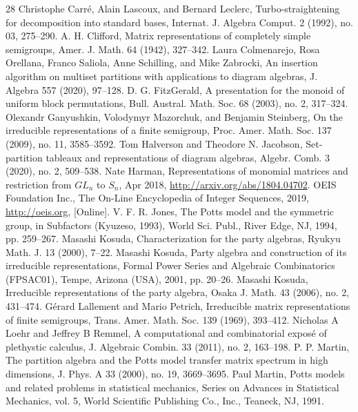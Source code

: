 \begin{thebibliography}{28}
 Christophe Carr\'e, Alain Lascoux, and Bernard Leclerc, Turbo-straightening for decomposition into standard bases, Internat. J. Algebra Comput. 2 (1992), no. 03, 275--290.
 A. H. Clifford, Matrix representations of completely simple semigroups, Amer. J. Math. 64 (1942), 327--342.
 Laura Colmenarejo, Rosa Orellana, Franco Saliola, Anne Schilling, and Mike Zabrocki, An insertion algorithm on multiset partitions with applications to diagram algebras, J. Algebra 557 (2020), 97--128.
 D. G. FitzGerald, A presentation for the monoid of uniform block permutations, Bull. Austral. Math. Soc. 68 (2003), no. 2, 317--324.
 Olexandr Ganyushkin, Volodymyr Mazorchuk, and Benjamin Steinberg, On the irreducible representations of a finite semigroup, Proc. Amer. Math. Soc. 137 (2009), no. 11, 3585--3592.
 Tom Halverson and Theodore N. Jacobson, Set-partition tableaux and representations of diagram algebras, Algebr. Comb. 3 (2020), no. 2, 509--538.
 Nate Harman, Representations of monomial matrices and restriction from $GL_n$ to $S_n$, Apr 2018, \url{http://arxiv.org/abs/1804.04702}.
 OEIS Foundation Inc., The On-Line Encyclopedia of Integer Sequences, 2019, \url{http://oeis.org}, [Online].
 V. F. R. Jones, The Potts model and the symmetric group, in Subfactors (Kyuzeso, 1993), World Sci. Publ., River Edge, NJ, 1994, pp. 259--267.
 Masashi Kosuda, Characterization for the party algebras, Ryukyu Math. J. 13 (2000), 7--22.
 Masashi Kosuda, Party algebra and construction of its irreducible representations, Formal Power Series and Algebraic Combinatorics (FPSAC01), Tempe, Arizona (USA), 2001, pp. 20--26.
 Masashi Kosuda, Irreducible representations of the party algebra, Osaka J. Math. 43 (2006), no. 2, 431--474.
 G\'erard Lallement and Mario Petrich, Irreducible matrix representations of finite semigroups, Trans. Amer. Math. Soc. 139 (1969), 393--412.
 Nicholas A Loehr and Jeffrey B Remmel, A computational and combinatorial expos\'e of plethystic calculus, J. Algebraic Combin. 33 (2011), no. 2, 163--198.
 P. P. Martin, The partition algebra and the Potts model transfer matrix spectrum in high dimensions, J. Phys. A 33 (2000), no. 19, 3669--3695.
 Paul Martin, Potts models and related problems in statistical mechanics, Series on Advances in Statistical Mechanics, vol. 5, World Scientific Publishing Co., Inc., Teaneck, NJ, 1991.

\end{thebibliography}
